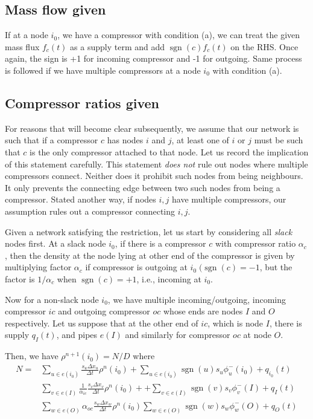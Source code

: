 \documentclass{amsart}
\DeclareMathOperator{\sgn}{sgn}
\begin{document}
\subsection{Mass flow given}

If at a node $i_0$, we have a compressor with condition (a), we can treat the given mass flux $f_c(t)$ as a supply term and add $\sgn(c)f_c(t)$ on the RHS. Once again, the sign is +1 for incoming compressor and -1 for outgoing.
Same process is followed if we have multiple compressors at a node $i_0$ with condition (a).

\subsection{Compressor ratios given}

For reasons that will become clear subsequently, we assume that our network is such that if a compressor $c$ has nodes $i$ and $j$, at least one of $i$ or $j$  must be such that $c$ is the only compressor attached to that node. Let us record the implication of this statement  carefully.
This statement \emph{does not} rule out nodes where multiple compressors connect. Neither does it prohibit  such nodes from being neighbours. It only prevents the connecting edge between two such nodes from being a compressor. Stated another way, if nodes $i, j$ have multiple compressors, our assumption rules out a compressor connecting $i,j$. 

Given a network satisfying the restriction, let us start by considering all \emph{slack} nodes first.
At a slack node $i_0$, if there is a compressor $c$ with compressor ratio $\alpha_c$, then the density at the node lying at other end of  the compressor is given by multiplying factor $\alpha_c$ if compressor is outgoing at $i_0 \; (\sgn(c) = -1$, but the factor is $1/\alpha_c$ when $\sgn(c) = +1$, i.e., incoming at $i_0$.



Now for a non-slack node $i_0$, we have multiple incoming/outgoing, incoming compressor $ic$ and outgoing compressor $oc$ whose ends are nodes $I$ and $O$ respectively.
Let us suppose that at the other end of $ic$, which is node $I$, there is supply $q_{I}(t)$, and pipes $e(I)$ and similarly for compressor $oc$ at node $O$.

Then, we have $\rho^{n+1}(i_0) = N/D$ 
where
\begin{align*}
N = & \sum_{u \in e(i_0)}\frac{s_u \Delta x_u}{\Delta t}\rho^n(i_0) +  \sum_{u \in e(i_0) }\sgn(u) s_u \phi_{u}^-(i_0) + q_{i_0}(t) \\ 
& \sum_{v \in e(I)}\frac{1}{\alpha_{ic}} \frac{s_{v} \Delta x_{v}}{\Delta t} \rho^n(i_0) + 
+ \sum_{v \in e(I)}\sgn(v) s_{v} \phi_{v}^-(I) + q_I(t) \\
& \sum_{w \in e(O)}\alpha_{oc} \frac{s_{w} \Delta x_{w}}{\Delta t} \rho^n(i_0) 
\sum_{w \in e(O)}\sgn(w) s_{w} \phi_{w}^-(O) +  q_{O}(t)   \\
\end{align*}
\end{document}
